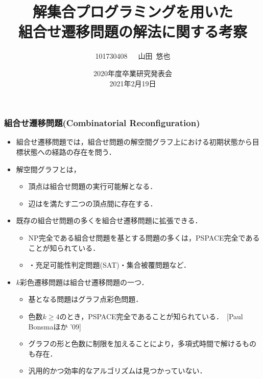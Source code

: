 \documentclass[dvipdfmx,11pt]{beamer}
\title[ASPを用いた組合せ遷移問題の解法に関する考察]{解集合プログラミングを用いた\\組合せ遷移問題の解法に関する考察}
\author{101730408~~~山田~悠也}
\date{2020年度卒業研究発表会\\2021年2月19日}
\institute{番原研究室}
\begin{document}
\begin{frame}\frametitle{}
  \titlepage
\end{frame}

\begin{frame}\frametitle{組合せ遷移問題(Combinatorial Reconfiguration)}

  \begin{itemize}
    \item \alert{組合せ遷移問題}では，組合せ問題の解空間グラフ上における初期状態から目標状態への経路の存在を問う．
    \item \alert{解空間グラフ}とは，
    \begin{itemize}
      \item 頂点は組合せ問題の実行可能解となる．
      \item 辺はを満たす二つの頂点間に存在する．
    \end{itemize} 
    \item 既存の組合せ問題の多くを組合せ遷移問題に拡張できる．
    \begin{itemize}
      \item NP完全である組合せ問題を基とする問題の多くは，\alert{PSPACE完全}であることが知られている．
      \item {}・充足可能性判定問題(SAT)・集合被覆問題など．
    \end{itemize}
    \item \alert{$k$彩色遷移問題}は組合せ遷移問題の一つ．
    \begin{itemize}
      \item 基となる問題はグラフ点彩色問題．
      \item 色数\alert{$k \geq 4$}のとき，PSPACE完全であることが知られている．~[Paul Bonsmaほか '09]
      \item グラフの形と色数に制限を加えることにより，多項式時間で解けるものも存在．
      \item \alert{汎用的かつ効率的なアルゴリズムは見つかっていない}．
    \end{itemize}
  \end{itemize}

\end{frame}
\end{document}
